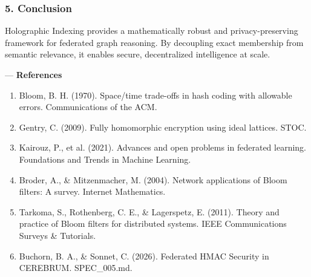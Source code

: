 \documentclass[10pt,journal,compsoc]{IEEEtran}
\begin{document}
\subsubsection{5. Conclusion}
Holographic Indexing provides a mathe\-matically robust and privacy-preserving framework for federated graph reasoning. By decoupling exact membership from semantic relevance, it enables secure, decen\-tralized intel\-ligence at scale.

---
\textbf{References}
\begin{enumerate}
\item Bloom, B. H. (1970). Space/time trade-offs in hash coding with allowable errors. Commun\-ications of the ACM.
\item Gentry, C. (2009). Fully homomorphic encryption using ideal lattices. STOC.
\item Kairouz, P., et al. (2021). Advances and open problems in federated learning. Foundations and Trends in Machine Learning.
\item Broder, A., \& Mitzen\-macher, M. (2004). Network appli\-cations of Bloom filters: A survey. Internet Mathematics.
\item Tarkoma, S., Rothenberg, C. E., \& Lagerspetz, E. (2011). Theory and practice of Bloom filters for distributed systems. IEEE Commun\-ications Surveys \& Tutorials.
\item Buchorn, B. A., \& Sonnet, C. (2026). Federated HMAC Security in CEREBRUM. SPEC\_005.md.

\end{enumerate}



\end{document}
